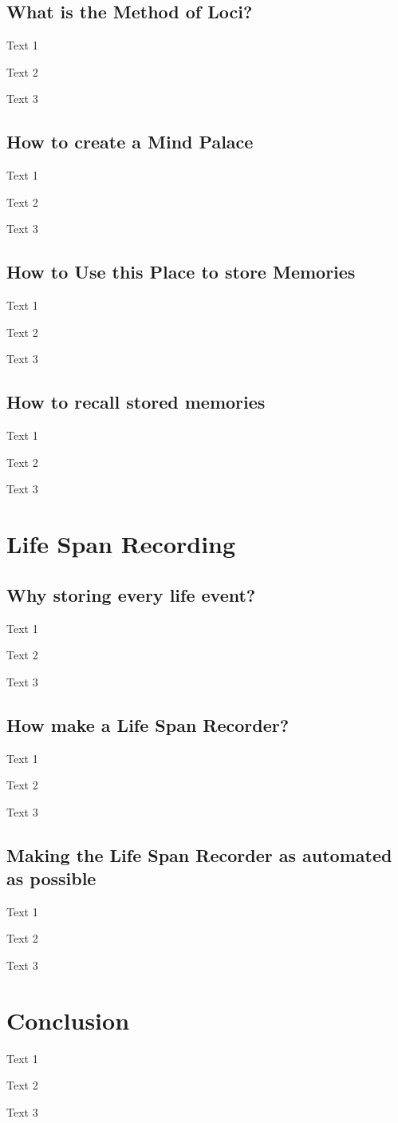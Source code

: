 \subsection{What is the Method of Loci?} \label{sec:a4.1}
Text 1

Text 2

Text 3

\subsection{How to create a Mind Palace} \label{sec:a4.2}
Text 1

Text 2

Text 3

\subsection{How to Use this Place to store Memories} \label{sec:a4.3}
Text 1

Text 2

Text 3

\subsection{How to recall stored memories} \label{sec:a4.4}
Text 1

Text 2

Text 3

\section{Life Span Recording} \label{sec:a5}

\subsection{Why storing every life event?} \label{sec:a5.1}
Text 1

Text 2

Text 3

\subsection{How make a Life Span Recorder?} \label{sec:a5.2}
Text 1

Text 2

Text 3

\subsection{Making the Life Span Recorder as automated as possible} \label{sec:a5.3}
Text 1

Text 2

Text 3

\section{Conclusion} \label{sec:a6}
Text 1

Text 2

Text 3